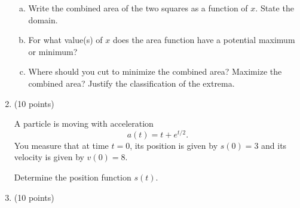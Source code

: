 \documentclass[11pt]{article}
\def\be{\begin{enumerate}}
\def\ee{\end{enumerate}}
\begin{document}
\begin{enumerate}
\begin{enumerate}[(a)]
	\item Write the combined area of the two squares as a function of $x$. State the domain.
	\vfill
	\item For what value(s) of $x$ does the area function have a potential maximum or minimum?
	\vfill
	\item Where should you cut to minimize the combined area? Maximize the combined area? Justify the classification of the extrema.
	\vfill
\end{enumerate}

\newpage
%

%
%


%
%
%
%
%
%

\newpage




\item (10 points)


A particle is moving with acceleration
\[a(t) = t+e^{t/2}.\]
You measure that at time $t = 0$, its position is given by $s(0) = 3$ and its velocity is given by $v(0) = 8$.

Determine the position function $s(t)$. 
\vfill

%
%
%
%
\newpage
\item (10 points)


\end{enumerate}
\end{document}
